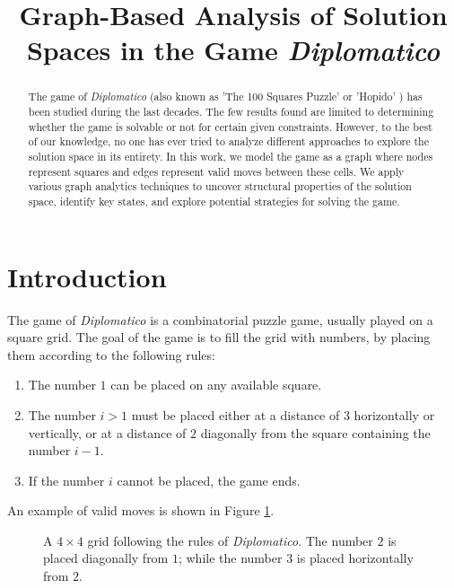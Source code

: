\documentclass[conference]{IEEEtran}
\title{\huge Graph-Based Analysis of Solution Spaces in the Game \textit{Diplomatico}}
\author{
    \IEEEauthorblockN{Filippo Garagnani}
    \IEEEauthorblockA{
        Dipartimento di Ingegneria "Enzo Ferrari" \\
        Università degli Studi di Modena e Reggio Emilia \\
        \texttt{298707@studenti.unimore.it}
    }
}
\begin{document}
\maketitle

\begin{abstract}
The game of \textit{Diplomatico} (also known as 'The 100 Squares Puzzle' or 'Hopido' \cite{hopido}) has been studied during the last decades. 
The few results found are limited to determining whether the game is solvable or not for certain given constraints.
However, to the best of our knowledge, no one has ever tried to analyze different approaches to explore the solution space in its entirety.
In this work, we model the game as a graph where nodes represent squares and edges represent valid moves between these cells. 
We apply various graph analytics techniques to uncover structural properties of the solution space, identify key states, and explore potential strategies for solving the game.
\end{abstract}


\section{Introduction}
The game of \textit{Diplomatico} is a combinatorial puzzle game, usually played on a square grid.
The goal of the game is to fill the grid with numbers, by placing them according to the following rules:
\begin{enumerate}
    \item The number $1$ can be placed on any available square.
    \item The number $i > 1$ must be placed either at a distance of $3$ horizontally or vertically, or at a distance of $2$ diagonally from the square containing the number $i-1$.
    \item If the number $i$ cannot be placed, the game ends.
\end{enumerate}

An example of valid moves is shown in Figure \ref{fig:example_moves}.
\begin{figure}[ht]
\centering
{}
\caption{A $4 \times 4$ grid following the rules of \textit{Diplomatico}. The number $2$ is placed diagonally from $1$; while the number $3$ is placed horizontally from $2$.}
\label{fig:example_moves}
\end{figure}
\end{document}
